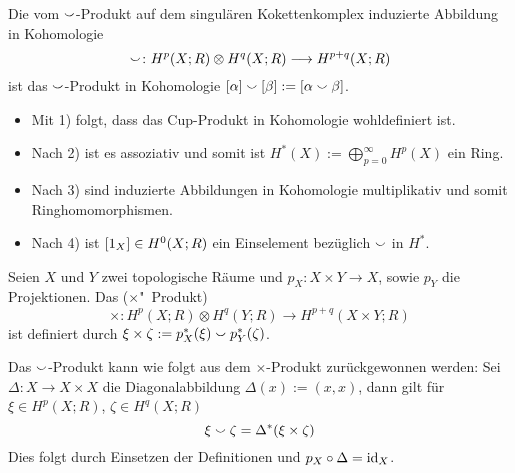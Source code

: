 \begin{definition}[{name=[Cup-Produkt in Kohomologie]}]
	Die vom $\cupp$-Produkt auf dem singulären Kokettenkomplex induzierte Abbildung in Kohomologie
	\[
		\cupp \colon H^p(X;R) \otimes H^q(X;R) \longrightarrow H^{p+q}(X;R)
	\]
	ist das $\cupp$-Produkt in Kohomologie $\benbrace*{\alpha} \cupp \benbrace*{\beta} := \benbrace*{\alpha \cupp \beta}$. 
	\begin{itemize}
		\item Mit 1) folgt, dass das Cup-Produkt in Kohomologie wohldefiniert ist. 
		\item Nach 2) ist es assoziativ und somit ist $H^*(X) := \bigoplus_{p=0}^\infty H^p(X)$ ein Ring. 
		\item Nach 3) sind induzierte Abbildungen in Kohomologie multiplikativ und somit Ringhomomorphismen. 
		\item Nach 4) ist $\benbrace*{1_X} \in H^0(X;R)$ ein Einselement bezüglich $\cupp$ in $H^*$.
	\end{itemize}
\end{definition}

\begin{definition}[{name=[Kreuz-Produkt]}]
	Seien $X$ und $Y$ zwei topologische Räume und $p_X \colon X \times Y \to X$, sowie $p_Y$ die Projektionen. 
	Das  ($\times$"~Produkt)
	\[
		\times \colon H^p(X;R) \otimes H^q(Y;R) \longrightarrow H^{p+q}(X \times Y;R)
	\]
	ist definiert durch $\xi \times \zeta := p_X^*(\xi) \cupp p_Y^*(\zeta)$. 
\end{definition}

\begin{bemerkung}[{name=[Zusammenhang von Kreuz- und Cup-Produkt]}]
	Das $\cupp$-Produkt kann wie folgt aus dem $\times$-Produkt zurückgewonnen werden: 
	Sei $\Delta \colon X \to X \times X$ die Diagonalabbildung $\Delta(x) := (x,x)$, dann gilt für $\xi \in H^p(X;R)$, $\zeta \in H^q(X;R)$
	\[
		\xi \cupp \zeta = \Delta^*(\xi \times \zeta)
	\]
	Dies folgt durch Einsetzen der Definitionen und $p_X \circ \Delta = \id_X$.
\end{bemerkung}

